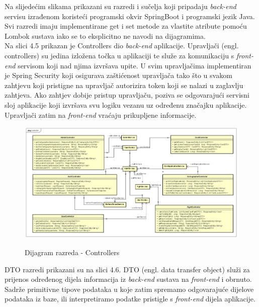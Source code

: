 			
			\textnormal{
				Na slijedećim slikama prikazani su razredi i sučelja koji pripadaju \textit{back-end} servisu izrađenom koristeći programski okvir SpringBoot i programski jezik Java. Svi razredi imaju implementirane get i set metode za vlastite atribute pomoću Lombok sustava iako se to eksplicitno ne navodi na dijagramima.
			} \\
			
			\textnormal{
				Na slici 4.5 prikazan je Controllers dio \textit{back-end} aplikacije. Upravljači (engl. controllers) su jedina izložena točka u aplikaciji te služe za komunikaciju s \textit{front-end} servisom koji nad njima izvršava upite. U svim upravljačima implementiran je Spring Security koji osigurava zaštićenost upravljača tako što u svakom zahtjevu koji pristigne na upravljač autorizira token koji se nalazi u zaglavlju zahtjeva. Ako zahtjev dobije pristup upravljaču, poziva se odgovarajući servisni sloj aplikacije koji izvršava svu logiku vezanu uz određenu značajku aplikacije. Upravljači zatim na \textit{front-end} vraćaju prikupljene informacije.
			}
			
			\begin{figure}[H]
				\centering
				\includegraphics[scale=0.45]{dijagrami/Controller_CD} \\
				\caption{Dijagram razreda - Controllers}
				\label{fig:ControllerCD}
			\end{figure}
		
			\textnormal{
				DTO razredi prikazani su na slici 4.6. DTO (engl. data transfer object) služi za prijenos određenog dijela informacija iz \textit{back-end} sustava na \textit{front-end} i obrnuto. Sadrže primitivne tipove podataka u koje zatim spremamo odgovarajuće dijelove podataka iz baze, ili interpretiramo podatke pristigle s \textit{front-end} dijela aplikacije. 
			}
		
